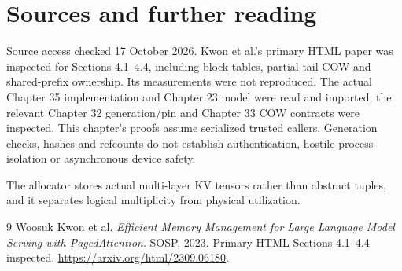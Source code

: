 \chapter*{Sources and further reading}
Source access checked 17 October 2026. Kwon et al.'s primary HTML paper was
inspected for Sections 4.1--4.4, including block tables, partial-tail COW and
shared-prefix ownership. Its measurements were not reproduced. The actual
Chapter 35 implementation and Chapter 23 model were read and imported;
the relevant Chapter 32 generation/pin and Chapter 33 COW contracts were
inspected. This chapter's proofs assume serialized trusted callers.
Generation checks, hashes and refcounts do not establish authentication,
hostile-process isolation or asynchronous device safety.

The allocator stores actual multi-layer KV tensors rather than abstract tuples, and it separates logical multiplicity from physical utilization.
\begin{thebibliography}{9}
 Woosuk Kwon et al.
\emph{Efficient Memory Management for Large Language Model Serving with
PagedAttention}. SOSP, 2023. Primary HTML Sections 4.1--4.4 inspected.
\url{https://arxiv.org/html/2309.06180}.
\end{thebibliography}
